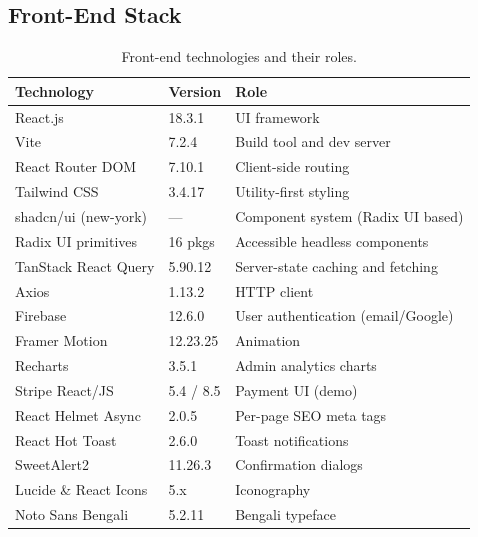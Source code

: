 \documentclass[12pt,a4paper]{report}
\begin{document}
\subsection{Front-End Stack}
\begin{table}[H]
\centering
\caption{Front-end technologies and their roles.}
\label{tab:frontend}
\small
\begin{tabularx}{\textwidth}{l l X}
\toprule
\textbf{Technology} & \textbf{Version} & \textbf{Role} \\
\midrule
React.js                 & 18.3.1   & UI framework \\
Vite                     & 7.2.4    & Build tool and dev server \\
React Router DOM         & 7.10.1   & Client-side routing \\
Tailwind CSS             & 3.4.17   & Utility-first styling \\
shadcn/ui (new-york)     & ---      & Component system (Radix UI based) \\
Radix UI primitives      & 16 pkgs  & Accessible headless components \\
TanStack React Query     & 5.90.12  & Server-state caching and fetching \\
Axios                    & 1.13.2   & HTTP client \\
Firebase                 & 12.6.0   & User authentication (email/Google) \\
Framer Motion            & 12.23.25 & Animation \\
Recharts                 & 3.5.1    & Admin analytics charts \\
Stripe React/JS          & 5.4 / 8.5 & Payment UI (demo) \\
React Helmet Async       & 2.0.5    & Per-page SEO meta tags \\
React Hot Toast          & 2.6.0    & Toast notifications \\
SweetAlert2              & 11.26.3  & Confirmation dialogs \\
Lucide \& React Icons    & 5.x      & Iconography \\
Noto Sans Bengali        & 5.2.11   & Bengali typeface \\
\bottomrule
\end{tabularx}
\end{table}
\end{document}

